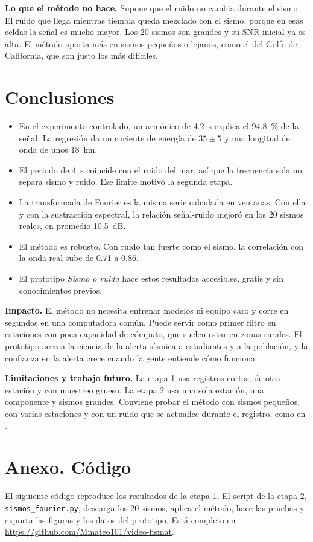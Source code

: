 \documentclass[11pt,letterpaper]{article}
\begin{document}
\textbf{Lo que el método no hace.} Supone que el ruido no cambia durante el sismo. El ruido que llega mientras tiembla queda mezclado con el sismo, porque en esas celdas la señal es mucho mayor. Los 20 sismos son grandes y su SNR inicial ya es alta. El método aporta más en sismos pequeños o lejanos, como el del Golfo de California, que son justo los más difíciles.

\section{Conclusiones}
\begin{itemize}
\item En el experimento controlado, un armónico de \SI{4.2}{s} explica el \SI{94.8}{\percent} de la señal. La regresión da un cociente de energía de $35 \pm 5$ y una longitud de onda de unos \SI{18}{km}.
\item El periodo de \SI{4}{s} coincide con el ruido del mar, así que la frecuencia sola no separa sismo y ruido. Ese límite motivó la segunda etapa.
\item La transformada de Fourier es la misma serie calculada en ventanas. Con ella y con la sustracción espectral, la relación señal-ruido mejoró en los 20 sismos reales, en promedio \SI{10.5}{dB}.
\item El método es robusto. Con ruido tan fuerte como el sismo, la correlación con la onda real sube de 0.71 a 0.86.
\item El prototipo \textit{Sismo o ruido} hace estos resultados accesibles, gratis y sin conocimientos previos.
\end{itemize}

\textbf{Impacto.} El método no necesita entrenar modelos ni equipo caro y corre en segundos en una computadora común. Puede servir como primer filtro en estaciones con poca capacidad de cómputo, que suelen estar en zonas rurales. El prototipo acerca la ciencia de la alerta sísmica a estudiantes y a la población, y la confianza en la alerta crece cuando la gente entiende cómo funciona \parencite{allen2018eos}.

\textbf{Limitaciones y trabajo futuro.} La etapa 1 usa registros cortos, de otra estación y con muestreo grueso. La etapa 2 usa una sola estación, una componente y sismos grandes. Conviene probar el método con sismos pequeños, con varias estaciones y con un ruido que se actualice durante el registro, como en \textcite{mousavi2016}.

\printbibliography[title={Referencias}]

\appendix
\section*{Anexo. Código}
El siguiente código reproduce los resultados de la etapa 1. El script de la etapa 2, \texttt{sismos\_fourier.py}, descarga los 20 sismos, aplica el método, hace las pruebas y exporta las figuras y los datos del prototipo. Está completo en \url{https://github.com/Mmateo101/video-fismat}.

\end{document}
